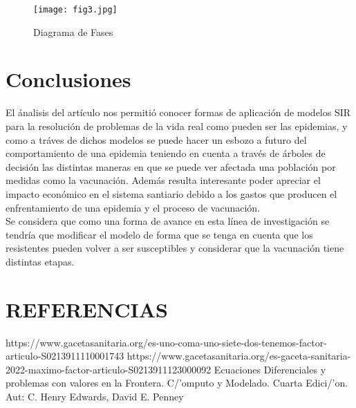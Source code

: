 \documentclass{wscpaperproc}
\theoremstyle{wsc}
\begin{document}
\begin{figure}%
	\texttt{[image: fig3.jpg]}
	\caption{Diagrama de Fases }
\end{figure}


\clearpage
\section*{Conclusiones}
El ánalisis del artículo nos permitió conocer formas de aplicación de modelos SIR para la resolución
de problemas de la vida real como pueden ser las epidemias, y como a tr\'aves de dichos modelos
se puede hacer un esbozo a futuro del comportamiento de una epidemia teniendo en cuenta
a trav\'es de \'arboles de decisi\'on las distintas maneras en que se puede ver afectada una 
poblaci\'on por medidas como la vacunaci\'on. Adem\'as resulta interesante
poder apreciar el impacto econ\'omico en el sistema santiario debido a los gastos que producen el enfrentamiento
de una epidemia y el proceso de vacunaci\'on.\\
Se considera que como una forma de avance en esta l\'inea de investigaci\'on se tendr\'ia que modificar el modelo
de forma que se tenga en cuenta que los resistentes pueden volver a ser susceptibles y considerar que la vacunaci\'on 
tiene distintas etapas.\\

\section*{REFERENCIAS}
https://www.gacetasanitaria.org/es-uno-coma-uno-siete-dos-tenemos-factor-articulo-S0213911110001743
https://www.gacetasanitaria.org/es-gaceta-sanitaria-2022-maximo-factor-articulo-S0213911123000092
Ecuaciones Diferenciales y problemas con valores en la Frontera. C/'omputo y Modelado. Cuarta Edici/'on. Aut: C. Henry Edwards, David E. Penney

\appendix

\clearpage
\end{document}
